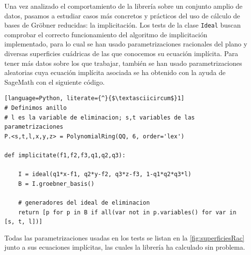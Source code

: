 Una vez analizado el comportamiento de la librería sobre un conjunto amplio de datos, pasamos a estudiar casos más concretos y prácticos del uso de cálculo de bases de Gröbner reducidas: la implicitación. Los tests de la clase \texttt{Ideal} buscan comprobar el correcto funcionamiento del algoritmo de implicitación implementado, para lo cual se han usado parametrizaciones racionales del plano y diversas superficies cuádricas de las que conocemos su ecuación implícita. Para tener más datos sobre los que trabajar, también se han usado parametrizaciones aleatorias cuya ecuación implícita asociada se ha obtenido con la ayuda de SageMath con el siguiente código.
\begin{lstlisting}[language=Python, literate={^}{$\textasciicircum$}1]
# Definimos anillo
# l es la variable de eliminacion; s,t variables de las parametrizaciones
P.<s,t,l,x,y,z> = PolynomialRing(QQ, 6, order='lex')

def implicitate(f1,f2,f3,q1,q2,q3):
    
    I = ideal(q1*x-f1, q2*y-f2, q3*z-f3, 1-q1*q2*q3*l)
    B = I.groebner_basis()
    
    # generadores del ideal de eliminacion
    return [p for p in B if all(var not in p.variables() for var in [s, t, l])]
\end{lstlisting}
Todas las parametrizaciones usadas en los tests se listan en la \autoref{fig:superficiesRac} junto a sus ecuaciones implícitas, las cuales la librería ha calculado sin problema.\newline
